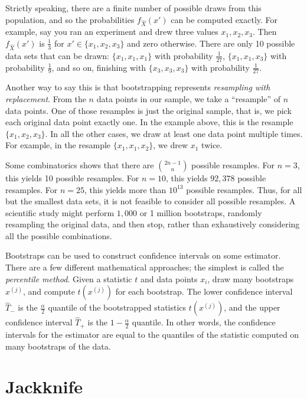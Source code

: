 Strictly speaking, there are a finite number of possible draws from this population, and so the probabilities $f_{\hat{X}}(x')$ can be computed exactly. For example, say you ran an experiment and drew three values $x_1, x_2, x_3$. Then $f_{\hat{X}}(x')$ is $\tfrac{1}{3}$ for $x' \in \{x_1,x_2,x_3\}$ and zero otherwise. There are only 10 possible data sets that can be drawn: $\{x_1,x_1,x_1\}$ with probability $\tfrac{1}{27}$, $\{x_1,x_1,x_3\}$ with probability $\tfrac{1}{9}$, and so on, finishing with $\{x_3,x_3,x_3\}$ with probability $\tfrac{1}{27}$.

Another way to say this is that bootstrapping represents \emph{resampling with replacement}. From the $n$ data points in our sample, we take a ``resample'' of $n$ data points. One of those resamples is just the original sample, that is, we pick each original data point exactly one. In the example above, this is the resample $\{x_1,x_2,x_3\}$. In all the other cases, we draw at least one data point multiple times. For example, in the resample $\{x_1,x_1,x_2\}$, we drew $x_1$ twice.

Some combinatorics shows that there are $\binom{2n-1}{n}$ possible resamples. For $n=3$, this yields 10 possible resamples. For $n=10$, this yields $92,378$ possible resamples. For $n=25$, this yields more than $10^{13}$ possible resamples. Thus, for all but the smallest data sets, it is not feasible to consider all possible resamples. A scientific study might perform $1,000$ or 1 million bootstraps, randomly resampling the original data, and then stop, rather than exhaustively considering all the possible combinations.

Bootstraps can be used to construct confidence intervals on some estimator. There are a few different mathematical approaches; the simplest is called the \emph{percentile method}. Given a statistic $t$ and data points $x_i$, draw many bootstraps $x^{(j)}$, and compute $t(x^{(j)})$ for each bootstrap. The lower confidence interval $\hat{T}_-$ is the $\tfrac{\alpha}{2}$ quantile of the bootstrapped statistics $t(x^{(j)})$, and the upper confidence interval $\hat{T}_+$ is the $1-\tfrac{\alpha}{2}$ quantile. In other words, the confidence intervals for the estimator are equal to the quantiles of the statistic computed on many bootstraps of the data.

\section{Jackknife}

